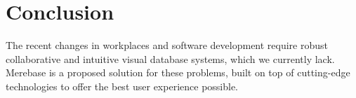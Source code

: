 \section{Conclusion}

The recent changes in workplaces and software development require robust
collaborative and intuitive visual database systems, which we currently
lack. Merebase is a proposed solution for these problems, built on top
of cutting-edge technologies to offer the best user experience possible.